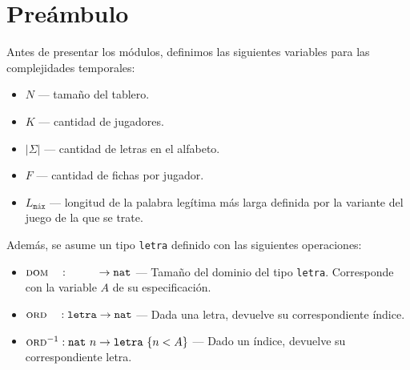\section{Preámbulo}
Antes de presentar los módulos, definimos las siguientes variables para las complejidades temporales:
\begin{itemize}
    \item $N$ \---- tamaño del tablero.
    \item $K$ \---- cantidad de jugadores.
    \item $|\Sigma|$ \---- cantidad de letras en el alfabeto.
    \item $F$ \---- cantidad de fichas por jugador.
    \item $L_{\texttt{máx}}$ \---- longitud de la palabra legítima más larga definida por la variante del juego de la que se trate.
\end{itemize}

Además, se asume un tipo \texttt{letra} definido con las siguientes operaciones:
\begin{itemize}
    \item $\textsc{dom}\quad :\quad\quad\quad \rightarrow\texttt{nat}$ \---- Tamaño del dominio del tipo \texttt{letra}. Corresponde con la variable $A$ de su especificación.
    \item $\textsc{ord}\quad:\texttt{letra}\rightarrow\texttt{nat}$ \---- Dada una letra, devuelve su correspondiente índice.
    \item $\textsc{ord}^{-1}: \texttt{nat}\ n\rightarrow\texttt{letra}\ \{n < A\}$ \---- Dado un índice, devuelve su correspondiente letra.
\end{itemize}

